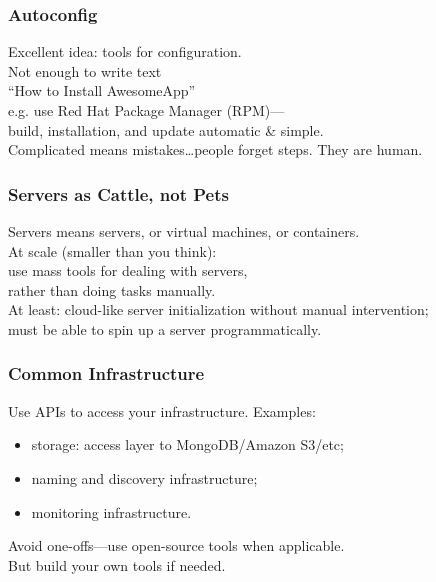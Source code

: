 \begin{frame}
\frametitle{Autoconfig}

\large
\begin{changemargin}{2cm}
Excellent idea: tools for configuration. \\[1em]

Not enough to write text \\
\qquad ``How to Install AwesomeApp'' \\[1em]

e.g. use Red Hat Package Manager (RPM)---\\
build, installation, and update automatic \& simple.\\[1em]

 Complicated means mistakes\ldots people forget steps. They are human. 
 \end{changemargin}
 
\end{frame}



\begin{frame}
\frametitle{Servers as Cattle, not Pets}

\large
\begin{changemargin}{2cm}
Servers means servers, or virtual machines, or containers.\\[1em]

At scale (smaller than you think):\\
use mass tools for dealing with servers, \\
rather than doing tasks manually. \\[1em]

At least: cloud-like server initialization without manual intervention;\\
must be able to spin up a server programmatically.
\end{changemargin}

\end{frame}



\begin{frame}
\frametitle{Common Infrastructure}

\large
\begin{changemargin}{1cm}
Use APIs to access your infrastructure. Examples:

\begin{itemize}
\item storage: access layer to MongoDB/Amazon S3/etc;
\item naming and discovery infrastructure;
\item monitoring infrastructure.
\end{itemize}

Avoid one-offs---use open-source tools when applicable.\\
But build your own tools if needed.
\end{changemargin}

\end{frame}



